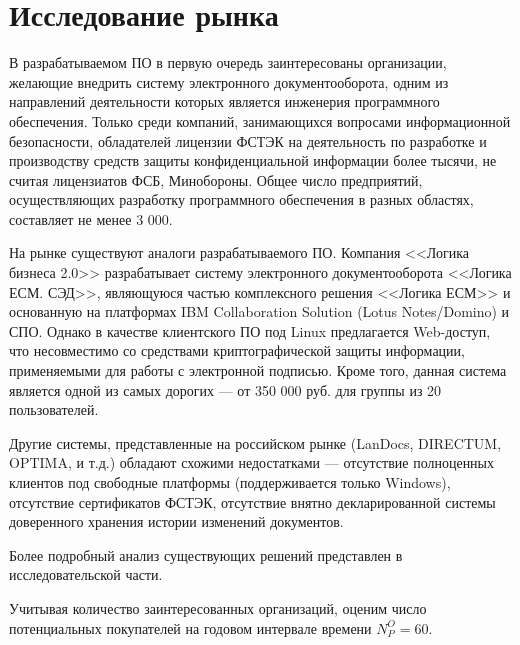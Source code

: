 \section{Исследование рынка} \label{economics_market_research}

В разрабатываемом ПО в первую очередь заинтересованы организации, желающие внедрить систему электронного документооборота, одним из направлений деятельности которых является инженерия программного обеспечения.
Только среди компаний, занимающихся вопросами информационной безопасности, обладателей лицензии ФСТЭК на деятельность по разработке и производству средств защиты конфиденциальной информации более тысячи, не считая лицензиатов ФСБ, Минобороны.
Общее число предприятий, осуществляющих разработку программного обеспечения в разных областях, составляет не менее 3 000.

\vspace{\baselineskip}
На рынке существуют аналоги разрабатываемого ПО. Компания <<Логика бизнеса 2.0>> разрабатывает систему электронного документооборота <<Логика ЕСМ. СЭД>>, являющуюся частью комплексного решения <<Логика ЕСМ>> и основанную на платформах IBM Collaboration Solution (Lotus Notes/Domino) и СПО. Однако в качестве клиентского ПО под Linux предлагается Web-доступ, что несовместимо со средствами криптографической защиты информации, применяемыми для работы с электронной подписью. Кроме того, данная система является одной из самых дорогих --- от 350 000 руб. для группы из 20 пользователей.

Другие системы, представленные на российском рынке (LanDocs, DIRECTUM, OPTIMA, и т.д.) обладают схожими недостатками --- отсутствие полноценных клиентов под свободные платформы (поддерживается только Windows), отсутствие сертификатов ФСТЭК, отсутствие внятно декларированной системы доверенного хранения истории изменений документов.

Более подробный анализ существующих решений представлен в исследовательской части.

\vspace{\baselineskip}
Учитывая количество заинтересованных организаций, оценим число потенциальных покупателей на годовом интервале времени $N_P^O = 60$.

